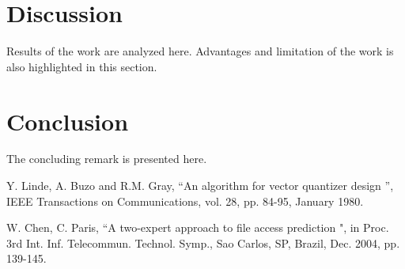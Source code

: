 \documentclass[a4paper,12pt]{article}
\begin{document}
\section{Discussion}\label{sec:ghi}
Results of the work are analyzed here. Advantages and limitation of the work is also highlighted in this section.

\section{Conclusion}\label{sec:jkl}
The concluding remark is presented here.


\begin{thebibliography}{9}
 Y. Linde, A. Buzo and R.M. Gray, \textquotedblleft An algorithm for vector quantizer design \textquotedblright, IEEE Transactions on Communications, vol. 28, pp. 84-95, January 1980.

 W. Chen, C. Paris, \textquotedblleft A two-expert approach
to file access prediction ",  in Proc. 3rd Int. Inf. Telecommun. Technol.
Symp., Sao Carlos, SP, Brazil, Dec. 2004, pp. 139-145.



\end{thebibliography}
\end{document}
